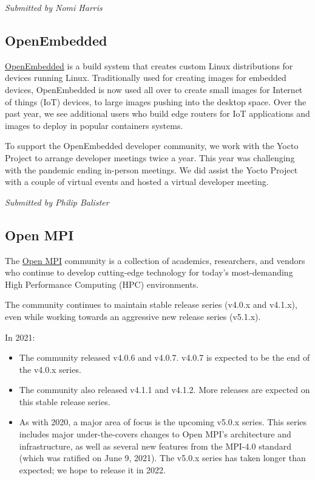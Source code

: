 \documentclass[a4paper]{report}
\begin{document}
{\em Submitted by Nomi Harris}

\subsection{OpenEmbedded}

\href{https://www.openembedded.org/}{OpenEmbedded} is a build system that creates custom Linux distributions for devices running Linux. Traditionally used for creating images for embedded devices, OpenEmbedded is now used all over to create small images for Internet of things (IoT) devices, to large images pushing into the desktop space.  Over the past year, we see additional users who build edge routers for IoT applications and images to deploy in popular containers systems.

To support the OpenEmbedded developer community, we work with the Yocto Project to arrange developer meetings twice a year. This year was challenging with the pandemic ending in-person meetings. We did assist the Yocto Project with a couple of virtual events and hosted a virtual developer meeting.

{\em Submitted by Philip Balister}

\subsection{Open MPI}

The \href{https://www.open-mpi.org/}{Open MPI} community is a collection of academics, researchers, and vendors who continue to develop cutting-edge technology for today's most-demanding High Performance Computing (HPC) environments.

The community continues to maintain stable release series (v4.0.x and v4.1.x), even while working towards an aggressive new release series (v5.1.x).

In 2021:

\begin{itemize}

\item The community released v4.0.6 and v4.0.7.  v4.0.7 is expected to be the end of the v4.0.x series.

\item The community also released v4.1.1 and v4.1.2.  More releases are expected on this stable release series.

\item As with 2020, a major area of focus is the upcoming v5.0.x series. This series includes major under-the-covers changes to Open MPI's architecture and infrastructure, as well as several new features from the MPI-4.0 standard (which was ratified on June 9, 2021).  The v5.0.x series has taken longer than expected; we hope to release it in 2022.

\end{itemize}
\end{document}
